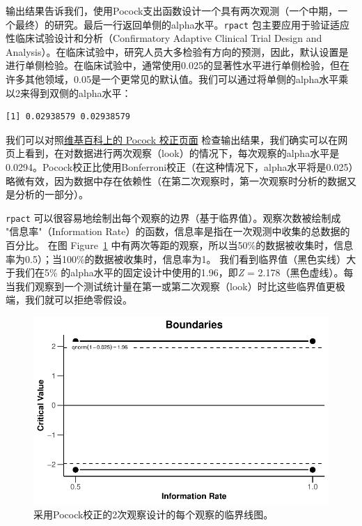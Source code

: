 \documentclass[
  letterpaper,
  DIV=11,
  numbers=noendperiod]{scrreprt}
\newenvironment{Shaded}{\begin{snugshade}}{\end{snugshade}}
\newcommand{\DecValTok}[1]{\textcolor[rgb]{0.68,0.00,0.00}{#1}}
\newcommand{\NormalTok}[1]{\textcolor[rgb]{0.00,0.23,0.31}{#1}}
\newcommand{\SpecialCharTok}[1]{\textcolor[rgb]{0.37,0.37,0.37}{#1}}
\begin{document}
输出结果告诉我们，使用Pocock支出函数设计一个具有两次观测（一个中期，一个最终）的研究。最后一行返回单侧的alpha水平。\texttt{rpact}
包主要应用于验证适应性临床试验设计和分析（Confirmatory Adaptive Clinical
Trial Design and
Analysis）。在临床试验中，研究人员大多检验有方向的预测，因此，默认设置是进行单侧检验。在临床试验中，通常使用0.025的显著性水平进行单侧检验，但在许多其他领域，0.05是一个更常见的默认值。我们可以通过将单侧的alpha水平乘以2来得到双侧的alpha水平：

\begin{Shaded}
\end{Shaded}

\begin{verbatim}
[1] 0.02938579 0.02938579
\end{verbatim}

我们可以对照\href{https://en.wikipedia.org/wiki/Pocock_boundary}{维基百科上的
Pocock 校正页面}
检查输出结果，我们确实可以在网页上看到，在对数据进行两次观察（look）的情况下，每次观察的alpha水平是0.0294。Pocock校正比使用Bonferroni校正（在这种情况下，alpha水平将是0.025）略微有效，因为数据中存在依赖性（在第二次观察时，第一次观察时分析的数据又是分析的一部分）。

\texttt{rpact}
可以很容易地绘制出每个观察的边界（基于临界值）。观察次数被绘制成
"信息率"（Information
Rate）的函数，信息率是指在一次观测中收集的总数据的百分比。 在图
Figure~\ref{fig-boundplot1}
中有两次等距的观察，所以当50\%的数据被收集时，信息率为0.5）；当100\%的数据被收集时，信息率为1。
我们看到临界值（黑色实线）大于我们在5\%
的alpha水平的固定设计中使用的1.96，即\emph{Z} =
2.178（黑色虚线）。每当我们观察到一个测试统计量在第一或第二次观察（look）时比这些临界值更极端，我们就可以拒绝零假设。

\begin{figure}

{\centering \includegraphics[width=1\textwidth,height=\textheight]{10-sequential_files/figure-pdf/fig-boundplot1-1.pdf}

}

\caption{\label{fig-boundplot1}采用Pocock校正的2次观察设计的每个观察的临界线图。}

\end{figure}
\end{document}

